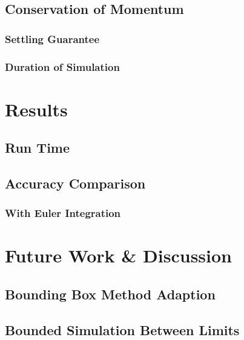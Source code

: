 	\subsection{Conservation of Momentum}

		\subsubsection{Settling Guarantee}

		\subsubsection{Duration of Simulation}



\section{Results}

	\subsection{Run Time}

	\subsection{Accuracy Comparison}

		\subsubsection{With Euler Integration}

\section{Future Work \& Discussion}

	\subsection{Bounding Box Method Adaption}

	\subsection{Bounded Simulation Between Limits}



